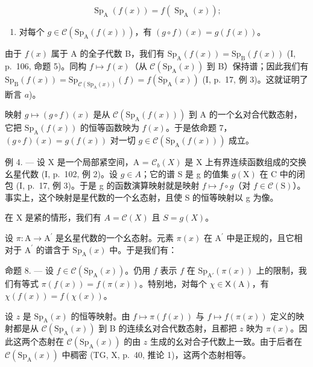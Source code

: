 \[
\operatorname{Sp} _ {\mathrm{A}} (f (x)) = f (\operatorname{Sp} _ {\mathrm{A}} (x));
\]

\begin{enumerate}
\def\labelenumi{\alph{enumi})}
\setcounter{enumi}{1}
\tightlist
\item
  对每个 \(g \in \mathcal{C}(\mathrm{Sp}_{\mathrm{A}}(f(x)))\)，有 \((g \circ f)(x) = g(f(x))\)。
\end{enumerate}

由于 \(f(x)\) 属于 A 的全子代数 B，我们有 \(\mathrm{Sp}_{\mathrm{A}}(f(x)) = \mathrm{Sp}_{\mathrm{B}}(f(x))\) (I, p.~106, 命题 5)。同构 \(f \mapsto f(x)\)（从 \(\mathcal{C}(\mathrm{Sp}_{\mathrm{A}}(x))\) 到 B）保持谱；因此我们有 \(\mathrm{Sp}_{\mathrm{B}}(f(x)) = \mathrm{Sp}_{\mathcal{C}(\mathrm{Sp}_{\mathrm{A}}(x))}(f) = f(\mathrm{Sp}_{\mathrm{A}}(x))\) (I, p.~17, 例 3)。这就证明了断言 \(a\))。

映射 \(g \mapsto (g \circ f)(x)\) 是从 \(\mathcal{C}(\mathrm{Sp}_{\mathrm{A}}(f(x)))\) 到 A 的一个幺对合代数态射，它把 \(\mathrm{Sp}_{\mathrm{A}}(f(x))\) 的恒等函数映为 \(f(x)\)。于是依命题 7，\((g \circ f)(x) = g(f(x))\) 对一切 \(g \in \mathcal{C}(\mathrm{Sp}_{\mathrm{A}}(f(x)))\) 成立。

例 4. --- 设 X 是一个局部紧空间，A = \(\mathcal{C}_{b}(X)\) 是 X 上有界连续函数组成的交换幺星代数 (I, p.~102, 例 2)。设 \(g \in A\)；它的谱 S 是 g 的值集 \(g(\mathrm{X})\) 在 C 中的闭包 (I, p.~17, 例 3)。于是 g 的函数演算映射就是映射 \(f \mapsto f \circ g\)（对 \(f \in \mathcal{C}(\mathrm{S})\)）。事实上，这个映射是星代数的一个幺态射，且使 S 的恒等映射以 g 为像。

在 X 是紧的情形，我们有 \(A = \mathcal{C}(X)\) 且 \(S = g(X)\)。

设 \(\pi\colon\mathrm{A}\to\mathrm{A}^{\prime}\) 是幺星代数的一个幺态射。元素 \(\pi(x)\) 在 \(\mathrm{A}^{\prime}\) 中是正规的，且它相对于 \(\mathrm{A}^{\prime}\) 的谱含于 \(\mathrm{Sp}_{\mathrm{A}}(x)\) 中。于是我们有：

命题 8. --- 设 \(f \in \mathcal{C}(\mathrm{Sp}_{\mathrm{A}}(x))\)。仍用 \(f\) 表示 \(f\) 在 \(\mathrm{Sp}_{\mathrm{A}'}(\pi(x))\) 上的限制，我们有等式 \(\pi(f(x)) = f(\pi(x))\)。特别地，对每个 \(\chi \in \mathsf{X}(\mathrm{A})\)，有 \(\chi(f(x)) = f(\chi(x))\)。

设 \(z\) 是 \(\mathrm{Sp}_{\mathrm{A}}(x)\) 的恒等映射。由 \(f \mapsto \pi(f(x))\) 与 \(f \mapsto f(\pi(x))\) 定义的映射都是从 \(\mathcal{C}(\mathrm{Sp}_{\mathrm{A}}(x))\) 到 B 的连续幺对合代数态射，且都把 \(z\) 映为 \(\pi(x)\)。因此这两个态射在 \(\mathcal{C}(\mathrm{Sp}_{\mathrm{A}}(x))\) 的由 \(z\) 生成的幺对合子代数上一致。由于后者在 \(\mathcal{C}(\mathrm{Sp}_{\mathrm{A}}(x))\) 中稠密 (TG, X, p.~40, 推论 1)，这两个态射相等。


